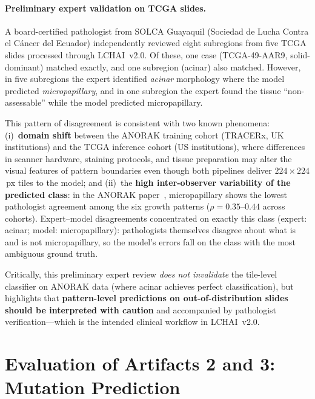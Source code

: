 \paragraph{Preliminary expert validation on TCGA slides.}
A board-certified pathologist from SOLCA Guayaquil (Sociedad de Lucha Contra el
C\'{a}ncer del Ecuador) independently reviewed eight subregions from
five TCGA slides processed through LCHAI~v2.0.
Of these, one case (TCGA-49-AAR9, solid-dominant) matched exactly,
and one subregion (acinar) also matched.
However, in five subregions the expert identified \emph{acinar} morphology
where the model predicted \emph{micropapillary}, and in one subregion
the expert found the tissue ``non-assessable'' while the model
predicted micropapillary.

This pattern of disagreement is consistent with two known phenomena:
(i)~\textbf{domain shift} between the ANORAK training cohort
(TRACERx, UK institutions) and the TCGA inference cohort (US
institutions), where differences in scanner hardware, staining
protocols, and tissue preparation may alter the visual features of
pattern boundaries even though both pipelines deliver
$224 \times 224$\,px tiles to the model; and
(ii)~the \textbf{high inter-observer variability of the predicted
class}: in the ANORAK paper~\cite{anorak2024}, micropapillary
shows the lowest pathologist agreement among the six growth patterns
($\rho = 0.35$--$0.44$ across cohorts).
Expert--model disagreements concentrated on exactly this class
(expert: acinar; model: micropapillary): pathologists themselves
disagree about what is and is not micropapillary, so the model's
errors fall on the class with the most ambiguous ground truth.

Critically, this preliminary expert review \emph{does not invalidate}
the tile-level classifier on ANORAK data (where acinar achieves
perfect classification), but highlights that
\textbf{pattern-level predictions on out-of-distribution slides
should be interpreted with caution} and accompanied by pathologist
verification---which is the intended clinical workflow in LCHAI~v2.0.


\section{Evaluation of Artifacts 2 and 3: Mutation Prediction}
\label{sec:eval:mutation}

